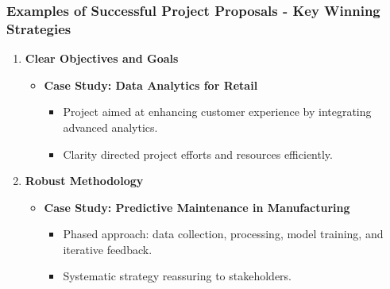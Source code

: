 \documentclass[aspectratio=169]{beamer}
\begin{document}
\begin{frame}[fragile]
    \frametitle{Examples of Successful Project Proposals - Key Winning Strategies}
    \begin{enumerate}
        \item \textbf{Clear Objectives and Goals}
        \begin{itemize}
            \item \textbf{Case Study: Data Analytics for Retail}
            \begin{itemize}
                \item Project aimed at enhancing customer experience by integrating advanced analytics.
                \item Clarity directed project efforts and resources efficiently.
            \end{itemize}
        \end{itemize}

        \item \textbf{Robust Methodology}
        \begin{itemize}
            \item \textbf{Case Study: Predictive Maintenance in Manufacturing}
            \begin{itemize}
                \item Phased approach: data collection, processing, model training, and iterative feedback.
                \item Systematic strategy reassuring to stakeholders.
            \end{itemize}
        \end{itemize}
    \end{enumerate}
\end{frame}
\end{document}
